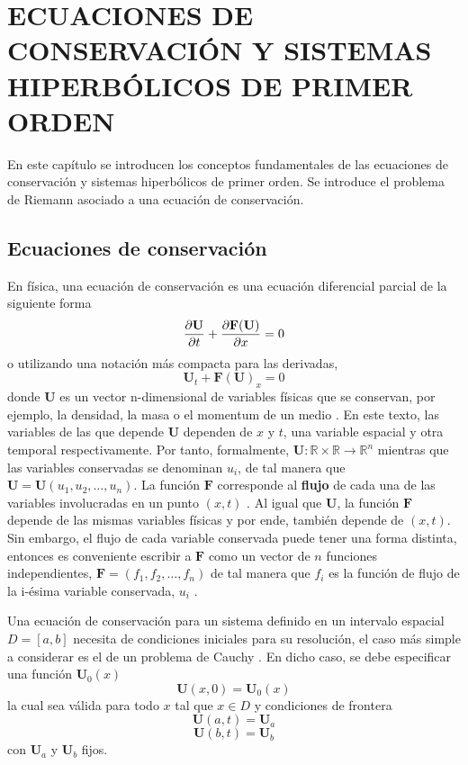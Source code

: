\chapter{ECUACIONES DE CONSERVACIÓN Y SISTEMAS HIPERBÓLICOS DE PRIMER ORDEN}
En este capítulo se introducen los conceptos fundamentales de las ecuaciones de conservación y sistemas hiperbólicos de primer orden. Se introduce el problema de Riemann asociado a una ecuación de conservación.
\section{Ecuaciones de conservación}
En física, una ecuación de conservación es una ecuación diferencial parcial de la siguiente forma
\begin{equation}
	\pdv{\mathbf{U}}{t} + \pdv{\mathbf{F}(\mathbf{U})}{x} = 0
	\label{eq:conservacion}
\end{equation}
o utilizando una notación más compacta para las derivadas,
\begin{equation}
	\mathbf{U}_{t} + \mathbf{F}(\mathbf{U})_{x} = 0
	\label{eq:conserv-deriv-short}
\end{equation}
donde $\mathbf{U}$ es un vector n-dimensional de variables físicas que se conservan, por ejemplo, la densidad, la masa o el momentum de un medio \cite{Leveque}. En este texto, las variables de las que depende $\mathbf{U}$ dependen de $x$ y $t$, una variable espacial y otra temporal respectivamente. Por tanto, formalmente, $\mathbf{U} : \mathbb{R} \times  \mathbb{R} \rightarrow \mathbb{R}^{n}$ mientras que las variables conservadas se denominan $u_{i}$, de tal manera que $\mathbf{U} = \mathbf{U}(u_{1}, u_{2}, \dots, u_{n})$\hspace{2mm}\cite{Leveque}. La función $\mathbf{F}$ corresponde al \textbf{flujo} de cada una de las variables involucradas en un punto $(x,t)$ \cite{Leveque}. Al igual que $\mathbf{U}$, la función $\mathbf{F}$ depende de las mismas variables físicas y por ende, también depende de $(x,t)$. Sin embargo, el flujo de cada variable conservada puede tener una forma distinta, entonces es conveniente escribir a $\mathbf{F}$ como un vector de $n$ funciones independientes, $\mathbf{F} = (f_{1}, f_{2}, \dots, f_{n})$
de tal manera que $f_i$ es la función de flujo de la i-ésima variable conservada, $u_i$ \cite{Leveque}.

Una ecuación de conservación para un sistema definido en un intervalo espacial $D = [a,b]$ necesita de condiciones iniciales para su resolución, el caso más simple a considerar es el de un problema de Cauchy \cite{Leveque}. En dicho caso, se debe especificar una función $\mathbf{U}_0(x)$
\begin{equation}
	\mathbf{U}(x,0) = \mathbf{U}_0(x)
\end{equation} 
la cual sea válida para todo $x$ tal que $x \in D$ y condiciones de frontera
\begin{equation}
	\mathbf{U}(a,t) = \mathbf{U}_{a}
\end{equation}
\begin{equation}
	\mathbf{U}(b,t) = \mathbf{U}_{b}
\end{equation}
con $\mathbf{U}_{a}$ y $\mathbf{U}_{b}$ fijos.

